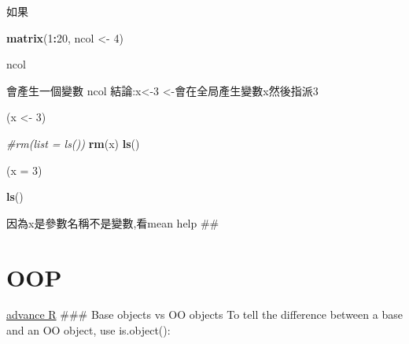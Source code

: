 \documentclass[]{book}
\newenvironment{Shaded}{\begin{snugshade}}{\end{snugshade}}
\newcommand{\CommentTok}[1]{\textcolor[rgb]{0.56,0.35,0.01}{\textit{#1}}}
\newcommand{\DataTypeTok}[1]{\textcolor[rgb]{0.13,0.29,0.53}{#1}}
\newcommand{\DecValTok}[1]{\textcolor[rgb]{0.00,0.00,0.81}{#1}}
\newcommand{\KeywordTok}[1]{\textcolor[rgb]{0.13,0.29,0.53}{\textbf{#1}}}
\newcommand{\NormalTok}[1]{#1}
\newcommand{\OperatorTok}[1]{\textcolor[rgb]{0.81,0.36,0.00}{\textbf{#1}}}
\newcommand{\StringTok}[1]{\textcolor[rgb]{0.31,0.60,0.02}{#1}}
\theoremstyle{definition}
\theoremstyle{definition}
\theoremstyle{definition}
\theoremstyle{remark}
\begin{document}
如果

\begin{Shaded}
\begin{Highlighting}[]
\KeywordTok{matrix}\NormalTok{(}\DecValTok{1}\OperatorTok{:}\DecValTok{20}\NormalTok{, ncol <-}\StringTok{ }\DecValTok{4}\NormalTok{)}
\end{Highlighting}
\end{Shaded}

\begin{Shaded}
\begin{Highlighting}[]
\NormalTok{ncol}
\end{Highlighting}
\end{Shaded}

會產生一個變數 ncol 結論:x\textless{}-3
\textless{}-會在全局產生變數x然後指派3

\begin{Shaded}
\begin{Highlighting}[]
\NormalTok{(x <-}\StringTok{ }\DecValTok{3}\NormalTok{)}
\end{Highlighting}
\end{Shaded}

\begin{Shaded}
\begin{Highlighting}[]
\CommentTok{#rm(list = ls())}
\KeywordTok{rm}\NormalTok{(x)}
\KeywordTok{ls}\NormalTok{()}
\end{Highlighting}
\end{Shaded}

\begin{Shaded}
\begin{Highlighting}[]
\NormalTok{(}\DataTypeTok{x =} \DecValTok{3}\NormalTok{)}
\end{Highlighting}
\end{Shaded}

\begin{Shaded}
\begin{Highlighting}[]
\KeywordTok{ls}\NormalTok{()}
\end{Highlighting}
\end{Shaded}

因為x是參數名稱不是變數,看mean help \#\#

\hypertarget{oop}{%
\section{OOP}\label{oop}}

\href{https://adv-r.hadley.nz/base-types.html}{advance R} \#\#\# Base
objects vs OO objects To tell the difference between a base and an OO
object, use is.object():
\end{document}
